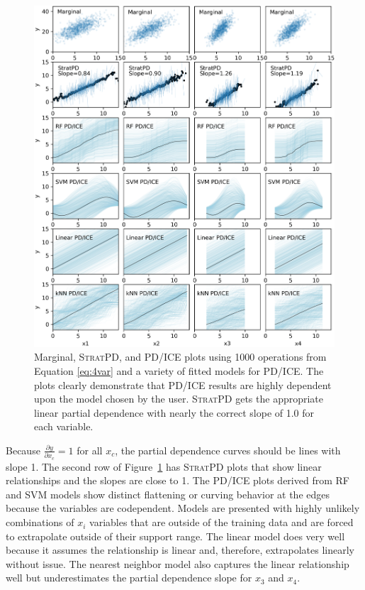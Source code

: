 \documentclass[12pt]{article}
\newcommand{\figref}[1]{Figure~\ref{#1}}
\newcommand{\spd}{\fontfamily{cmr}\textsc{\small StratPD}}
\begin{document}
\begin{figure}[htbp]
\begin{center}
\includegraphics[scale=0.6]{images/multivar_multimodel_normal.png}
\caption{Marginal, \spd{}, and PD/ICE plots using 1000 operations from Equation \eqref{eq:4var} and a variety of fitted models for PD/ICE. The plots clearly demonstrate that PD/ICE results are highly dependent upon the model chosen by the user. \spd{} gets the appropriate linear partial dependence with nearly the correct slope of 1.0 for each variable.}
\label{fig:4var}
\end{center}
\end{figure}

Because $\frac{\partial y}{\partial x_{c}} = 1$ for all $x_c$, the partial dependence curves should be lines with slope 1.  The second row of \figref{fig:4var} has \spd{} plots that show linear relationships and the slopes are close to 1.  The PD/ICE plots derived from RF and SVM models show distinct flattening or curving behavior at the edges because the variables are codependent. Models are presented with highly unlikely combinations of $x_i$ variables that are outside of the training data and are forced to extrapolate outside of their support range.  The linear model does very well because it assumes the relationship is linear and, therefore, extrapolates linearly without issue. The nearest neighbor model also captures the linear relationship well but underestimates the partial dependence slope for $x_3$ and $x_4$.
 
\end{document}
